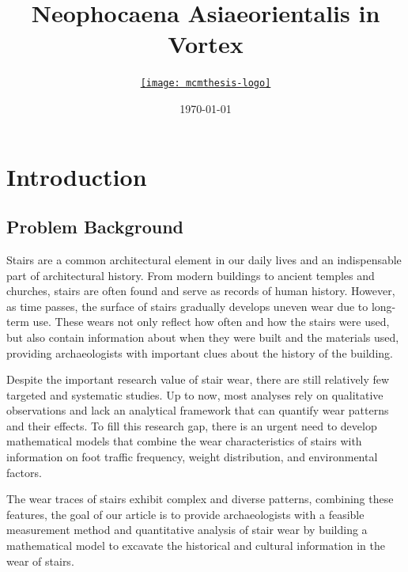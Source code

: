 \documentclass{mcmthesis}
\title{Neophocaena Asiaeorientalis in Vortex}
\author{\small \href{https://www.latexstudio.net/}
  {\texttt{[image: mcmthesis-logo]}}}
\date{\today}
\begin{document}
\begin{abstract}%
    \par       
\begin{keywords}%
               
\end{keywords}
\end{abstract}   

\maketitle
\newpage
\pagestyle{main}
\setcounter{page}{2} %
\tableofcontents

\newpage
\section{Introduction}
\subsection{Problem Background}
Stairs are a common architectural element in our daily lives and an indispensable part of architectural history. From modern buildings to ancient temples and churches, stairs are often found and serve as records of human history. However, as time passes, the surface of stairs gradually develops uneven wear due to long-term use. These wears not only reflect how often and how the stairs were used, but also contain information about when they were built and the materials used, providing archaeologists with important clues about the history of the building.

Despite the important research value of stair wear, there are still relatively few targeted and systematic studies. Up to now, most analyses rely on qualitative observations and lack an analytical framework that can quantify wear patterns and their effects. To fill this research gap, there is an urgent need to develop mathematical models that combine the wear characteristics of stairs with information on foot traffic frequency, weight distribution, and environmental factors.

The wear traces of stairs exhibit complex and diverse patterns, combining these features, the goal of our article is to provide archaeologists with a feasible measurement method and quantitative analysis of stair wear by building a mathematical model to excavate the historical and cultural information in the wear of stairs.
\end{document}
